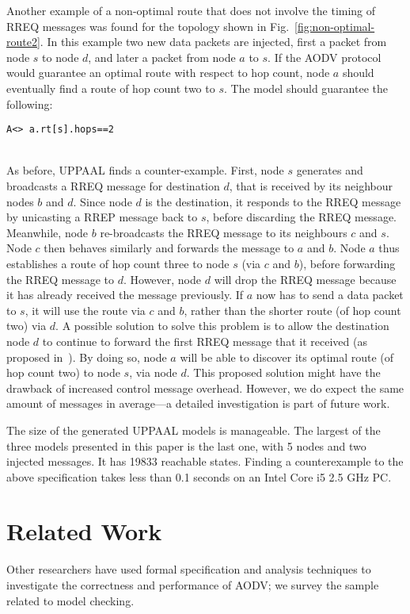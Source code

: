 \documentclass[conference,twoside]{IEEEtran}
\begin{document}
Another example of a non-optimal route that does not involve the
timing of RREQ messages was found for the topology shown in
Fig.~\ref{fig:non-optimal-route2}. In this example two new data
packets are injected, first a packet from node $s$ to node $d$,  and
later a packet from node $a$ to $s$.  If the AODV protocol would
guarantee an optimal route with respect to hop count, node $a$ should eventually find a route of hop count two to $s$. The model should guarantee the following:
\\[2mm]\centerline{\tt A<> a.rt[s]\!.hops==2}\\[2mm]
As before, UPPAAL finds a counter-example. First, node $s$ generates and
broadcasts a RREQ message for destination $d$, that is received by its neighbour nodes $b$ and $d$.
Since node $d$ is the destination, it  responds to the RREQ message by  unicasting a RREP message back to $s$, before discarding the RREQ message.
Meanwhile, node $b$ re-broadcasts the RREQ message to its neighbours  $c$ and $s$. Node $c$ then behaves similarly and forwards the
message to $a$ and $b$.  Node $a$ thus establishes a route of hop count three to node $s$ (via $c$ and $b$), before forwarding the RREQ message to $d$. However, node $d$ will drop the RREQ message because it has already received the message previously. If $a$ now has to send a data packet to $s$, it will use the route via $c$ and $b$, rather than the shorter route (of hop count two) via $d$. A possible solution to solve this problem is to allow the destination node $d$ to continue to forward the first RREQ message that it received (as proposed in~\cite{TR11}). By doing so, node $a$ will be able to discover its optimal route (of hop count two) to node $s$, via node $d$.
This proposed solution might have the drawback of increased control message overhead.
However, we do expect the same amount of messages in average---a detailed investigation is part of future work.

The size of the generated UPPAAL models is manageable. The largest of the three models presented in this paper is the last one, with 5 nodes and two injected messages. It has 19833 reachable states. Finding a counterexample to the above specification takes less than 0.1 seconds on an Intel Core i5 2.5 GHz PC.
\section{Related Work}
\label{sec:related}

Other researchers have used formal specification and analysis techniques to investigate the correctness and performance of AODV; we survey the sample  related to model checking.
\end{document}
